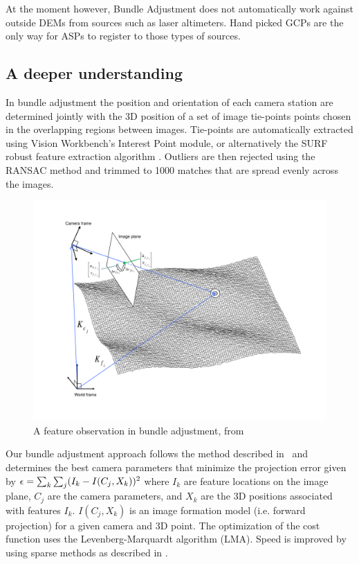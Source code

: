 At the moment however, Bundle Adjustment does not automatically work
against outside DEMs from sources such as laser altimeters. Hand
picked \acp{GCP} are the only way for \acp{ASP} to register to those
types of sources.

\subsection{A deeper understanding}

In bundle adjustment the position and orientation of each camera
station are determined jointly with the 3D position of a set of image
tie-points points chosen in the overlapping regions between images.
Tie-points are automatically extracted using Vision Workbench's
Interest Point module, or alternatively the SURF robust feature
extraction algorithm \citep{surf08}. Outliers are then rejected using the
RANSAC method \citep{fischler81} and trimmed to 1000 matches that are
spread evenly across the images.

\begin{figure}[b!]
  \begin{center}
  \includegraphics[trim=20mm 20mm 20mm 15mm,clip,width=6in]{images/ba_feature_observation.pdf}
  \end{center}
  \caption{ A feature observation in bundle adjustment, from \citet{moore09} }
  \label{fig:ba_feature}
\end{figure}

Our bundle adjustment approach follows the method described
in~\cite{triggs00} and determines the best camera
parameters that minimize the projection error given by ${\bf \epsilon}
= \sum_k\sum_j(I_k-I(C_j, X_k))^2$ where $I_k$ are feature locations
on the image plane, $C_j$ are the camera parameters, and $X_k$ are the
3D positions associated with features $I_k$. $I(C_j, X_k)$ is an image
formation model (i.e. forward projection) for a given camera and 3D
point. The optimization of the cost function uses the
Levenberg-Marquardt algorithm (LMA). Speed is improved by using sparse
methods as described in \citet{hartley04}.

